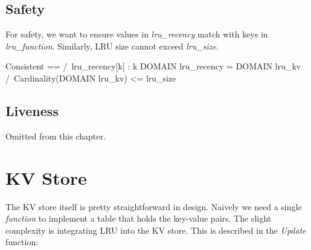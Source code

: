 \subsection{Safety}

For safety, we want to ensure values in \textit{lru\_recency} match with keys
in \textit{lru\_function}. Similarly, LRU size cannot exceed \textit{lru\_size}.\\

\begin{tla}
    Consistent ==
    /\ {lru_recency[k] : k \in DOMAIN lru_recency} = DOMAIN lru_kv
    /\ Cardinality(DOMAIN lru_kv) <= lru_size
\end{tla}
\begin{tlatex}
%
%
\end{tlatex}

\subsection{Liveness}

Omitted from this chapter. 

\section{KV Store}

The KV store itself is pretty straightforward in design. Naively we need a
single \textit{function} to implement a table that holds the key-value pairs.
The slight complexity is integrating LRU into the KV store. This is described in
the \textit{Update} function:\\

